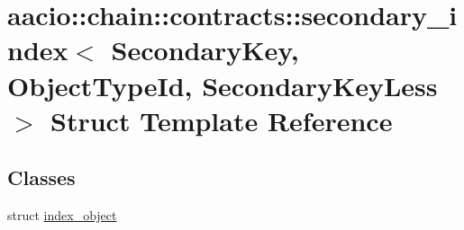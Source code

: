 \hypertarget{structaacio_1_1chain_1_1contracts_1_1secondary__index}{}\section{aacio\+:\+:chain\+:\+:contracts\+:\+:secondary\+\_\+index$<$ Secondary\+Key, Object\+Type\+Id, Secondary\+Key\+Less $>$ Struct Template Reference}
\label{structaacio_1_1chain_1_1contracts_1_1secondary__index}
\subsection*{Classes}
\begin{DoxyCompactItemize}
\item 
struct \mbox{\hyperlink{structaacio_1_1chain_1_1contracts_1_1secondary__index_1_1index__object}{index\+\_\+object}}
\end{DoxyCompactItemize}
